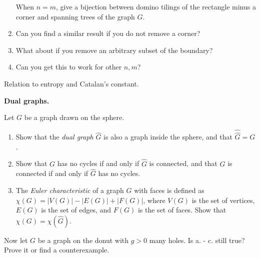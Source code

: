 \documentclass[11pt,fleqn]{book} %
\begin{document}
\begin{problem}
\begin{enumerate}[label=\alph*.]
\begin{center}
        \end{center}
    When $n=m$, give a bijection between domino tilings of the rectangle minus a corner and spanning trees of the graph $G$.
    \item Can you find a similar result if you do not remove a corner?
    \item What about if you remove an arbitrary subset of the boundary?
    \item Can you get this to work for other $n,m$?
  \end{enumerate}

\end{problem}

\begin{problem}

Relation to entropy and Catalan's constant. 
   
\end{problem}








\textbf{Dual graphs.}

\begin{problem}
  Let $G$ be a graph drawn on the sphere. 
  \begin{enumerate}[label =\alph*.]
   \item Show that the \textit{dual graph} $\widehat{G}$ is also a graph inside the sphere, and that $\widehat{\widehat{G}}=G$.
   \item Show that $G$ has no cycles if and only if $\widehat{G}$ is connected, and that $G$ is connected if and only if $\widehat{G}$ has no cycles.
   \item The \textit{Euler characteristic} of a graph $G$ with faces is defined as $\chi(G) = |V(G)| - |E(G)| + |F(G)|$, where $V(G)$ is the set of vertices, $E(G)$ is the set of edges, and $F(G)$ is the set of faces. Show that $\chi(G) = \chi(\widehat{G})$.
  \end{enumerate}
Now let $G$ be a graph on the donut with $g>0$ many holes. Is a. - c. still true? Prove it or find a counterexample.
\end{problem}
\end{document}
